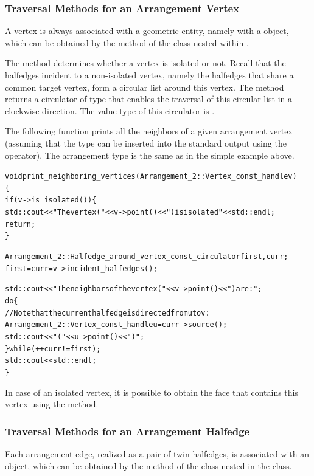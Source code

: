 \subsubsection{Traversal Methods for an Arrangement Vertex}
\label{arr_sssec:tr_vertex}
%
A vertex is always associated with a geometric entity, namely with
a  object, which can be obtained by the 
method of the  class nested within .

The  method determines whether a vertex is isolated
or not. Recall that the halfedges incident to a non-isolated vertex,
namely the halfedges that share a common target vertex, form a circular
list around this vertex. The  method returns
a circulator of type 
that enables the traversal of this circular list in a clockwise
direction. The value type of this circulator is .

The following function prints all the neighbors of a given
arrangement vertex (assuming that the  type can be
inserted into the standard output using the \ccc{<<} operator). The
arrangement type is the same as in the simple example above.
\begin{alltt}
void print_neighboring_vertices (Arrangement_2::Vertex_const_handle v)
\{
  if (v->is_isolated()) \{
    std::cout << "The vertex (" << v->point() << ") is isolated" << std::endl;
    return;
  \}

  Arrangement_2::Halfedge_around_vertex_const_circulator first, curr;
  first = curr = v->incident_halfedges();

  std::cout << "The neighbors of the vertex (" << v->point() << ") are:";
  do \{
    // Note that the current halfedge is directed from u to v:
    Arrangement_2::Vertex_const_handle u = curr->source();
    std::cout << " (" << u->point() << ")";
  \} while (++curr != first);
  std::cout << std::endl;
\}
\end{alltt}

In case of an isolated vertex, it is possible to obtain the face
that contains this vertex using the  method.

\subsubsection{Traversal Methods for an Arrangement Halfedge}
\label{arr_sssec:tr_halfedge}
%
Each arrangement edge, realized as a pair of twin halfedges,
is associated with an  object, which
can be obtained by the  method of the 
class nested in the  class.

